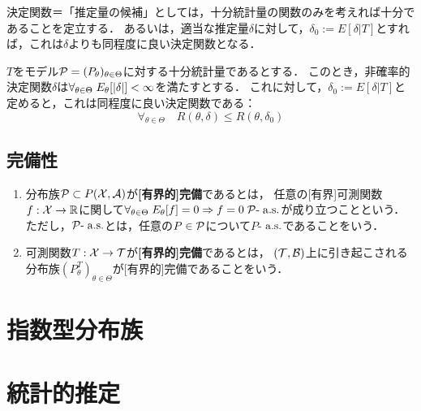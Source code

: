 \documentclass[uplatex,dvipdfmx]{jsreport}
\begin{document}
\begin{tcolorbox}[colframe=ForestGreen, colback=ForestGreen!10!white,breakable,colbacktitle=ForestGreen!40!white,coltitle=black,fonttitle=\bfseries\sffamily,
title=]
    決定関数＝「推定量の候補」としては，十分統計量の関数のみを考えれば十分であることを定立する．
    あるいは，適当な推定量$\delta$に対して，$\delta_0:=E[\delta|T]$とすれば，これは$\delta$よりも同程度に良い決定関数となる．
\end{tcolorbox}

\begin{theorem}
    $T$をモデル$\P=(P_\theta)_{\theta\in\Theta}$に対する十分統計量であるとする．
    このとき，非確率的決定関数$\delta$は$\forall_{\theta\in\Theta}\;E_\theta[\abs{\delta}]<\infty$を満たすとする．
    これに対して，$\delta_0:=E[\delta|T]$と定めると，これは同程度に良い決定関数である：
    \[\forall_{\theta\in\Theta}\quad R(\theta,\delta)\le R(\theta,\delta_0)\]
\end{theorem}


\subsection{完備性}

\begin{definition}\mbox{}
    \begin{enumerate}
        \item 分布族$\P\subset P(\X,\A)$が\textbf{[有界的]完備}であるとは，
        任意の[有界]可測関数$f:\X\to\R$に関して$\forall_{\theta\in\Theta}\;E_\theta[f]=0\Rightarrow f=0\;\P\text{-}\as$が成り立つことという．
        ただし，$\P\text{-}\as$とは，任意の$P\in\P$について$P$-$\as$であることをいう．
        \item 可測関数$T:\X\to\cT$が\textbf{[有界的]完備}であるとは，
        $(\cT,\B)$上に引き起こされる分布族$(P^T_\theta)_{\theta\in\Theta}$が[有界的]完備であることをいう．
    \end{enumerate}
\end{definition}

\section{指数型分布族}

\section{統計的推定}
\end{document}
